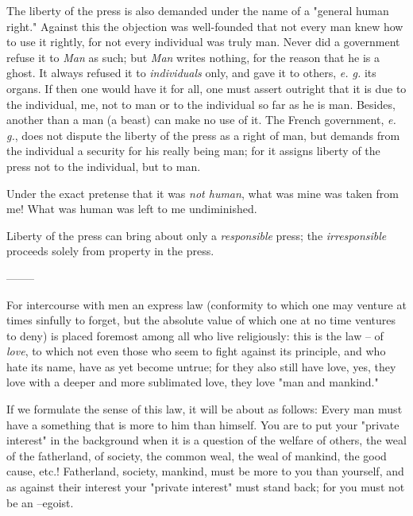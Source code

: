 \documentclass[a4paper]{book}
\begin{document}
The liberty of the press is also demanded under the name of a "{}general human 
right."{} Against this the objection was well-founded that not every man knew 
how to use it rightly, for not every individual was truly man. Never did a 
government refuse it to \textit{Man} as such; but \textit{Man} writes nothing, 
for the reason that he is a ghost. It always refused it to 
\textit{individuals} only, and gave it to others, \textit{e. g.} its organs. 
If then one would have it for all, one must assert outright that it is due to 
the individual, me, not to man or to the individual so far as he is man. 
Besides, another than a man (a beast) can make no use of it. The French 
government, \textit{e. g.}, does not dispute the liberty of the press as a 
right of man, but demands from the individual a security for his really being 
man; for it assigns liberty of the press not to the individual, but to man.

Under the exact pretense that it was \textit{not human}, what was mine was 
taken from me! What was human was left to me undiminished.

Liberty of the press can bring about only a \textit{responsible} press; the 
\textit{irresponsible} proceeds solely from property in the press.

\begin{center}
--------\end{center}


For intercourse with men an express law (conformity to which one may venture 
at times sinfully to forget, but the absolute value of which one at no time 
ventures to deny) is placed foremost among all who live religiously: this is 
the law -- of \textit{love}, to which not even those who seem to fight against 
its principle, and who hate its name, have as yet become untrue; for they also 
still have love, yes, they love with a deeper and more sublimated love, they 
love "{}man and mankind."{}

If we formulate the sense of this law, it will be about as follows: Every man 
must have a something that is more to him than himself. You are to put your 
"{}private interest"{} in the background when it is a question of the welfare 
of others, the weal of the fatherland, of society, the common weal, the weal 
of mankind, the good cause, etc.! Fatherland, society, mankind, must be more 
to you than yourself, and as against their interest your "{}private 
interest"{} must stand back; for you must not be an --egoist.
\end{document}
